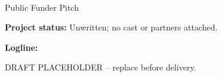\documentclass[11pt,letterpaper]{article}
\begin{document}
\begin{center}
{\Large\bfseries\sffamily \filmtitleupper}\\[6pt]
Public Funder Pitch
\end{center}
\textbf{Project status:} Unwritten; no cast or partners attached.

\textbf{Logline:} \filmlogline

DRAFT PLACEHOLDER -- replace before delivery.
\end{document}
